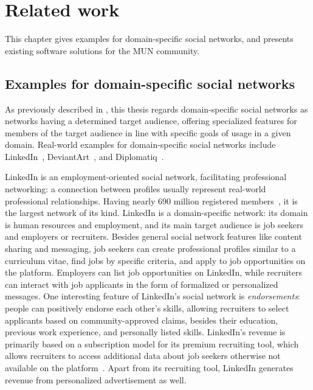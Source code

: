 \chapter{Related work}
\label{chapter:relatedwork}

This chapter gives examples for domain-specific social networks, and presents existing software solutions for the MUN community.

\section{Examples for domain-specific social networks}

As previously described in , this thesis regards domain-specific social networks as networks having a determined target audience, offering specialized features for members of the target audience in line with specific goals of usage in a given domain. Real-world examples for domain-specific social networks include LinkedIn~\cite{about-linkedin}, DeviantArt~\cite{about-deviantart}, and Diplomatiq~\cite{diplomatiq-app}.

LinkedIn is an employment-oriented social network, facilitating professional networking: a connection between profiles usually represent real-world professional relationships. Having nearly 690 million registered members~\cite{about-linkedin}, it is the largest network of its kind. LinkedIn is a domain-specific network: its domain is human resources and employment, and its main target audience is job seekers and employers or recruiters. Besides general social network features like content sharing and messaging, job seekers can create professional profiles similar to a curriculum vitae, find jobs by specific criteria, and apply to job opportunities on the platform. Employers can list job opportunities on LinkedIn, while recruiters can interact with job applicants in the form of formalized or personalized messages. One interesting feature of LinkedIn's social network is \emph{endorsements}: people can positively endorse each other's skills, allowing recruiters to select applicants based on community-approved claims, besides their education, previous work experience, and personally listed skills. LinkedIn's revenue is primarily based on a subscription model for its premium recruiting tool, which allows recruiters to access additional data about job seekers otherwise not available on the platform~\cite{linkedin-business-model}. Apart from its recruiting tool, LinkedIn generates revenue from personalized advertisement as well.

